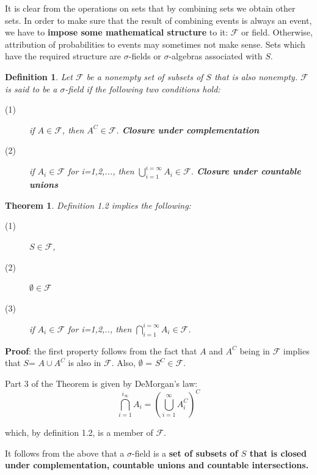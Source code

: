 \documentclass{article}
\newtheorem{definition}{Definition}[section]
\newtheorem{theorem}{Theorem}[section]
\begin{document}
It is clear from the operations on sets that by combining sets we obtain other sets. In order to make sure that the result of combining events is always an event, we have to \textbf{impose some mathematical structure} to it: \( \mathcal{F}\) or field. Otherwise, attribution of probabilities to events may sometimes not make sense. Sets which have the required structure are $\sigma$-fields or $\sigma$-algebras associated with \(S\).

\begin{definition}
    Let \( \mathcal{F}\) be a nonempty set of subsets of \(S\) that is also nonempty. \( \mathcal{F}\) is said to be a $\sigma$-field if the following two conditions hold:
    \begin{description}
        \item[(1)] if \(A \in \mathcal{F}\), then \(A^C \in \mathcal{F}\). \textbf{Closure under complementation}
        \item[(2)] if \(A_i \in \mathcal{F}\) for i=1,2,..., then \(\bigcup_{i=1}^{i=\infty} A_i \in \mathcal{F}\). \textbf{Closure under countable unions}
    \end{description}
\end{definition}

\begin{theorem}
    Definition 1.2 implies the following: 
    \begin{description}
        \item[(1)] \(S\in \mathcal{F}\),
        \item[(2)] \(\emptyset\in \mathcal{F}\) 
        \item[(3)] if \(A_i\in \mathcal{F}\) for i=1,2,.., then \(\bigcap_{i=1}^{i=\infty}A_i \in \mathcal{F}\).
    \end{description}  
\end{theorem}

\textbf{Proof}: the first property follows from the fact that \(A\) and \(A^C\) being in \( \mathcal{F}\) implies that \(S\)= \(A \cup A^C \) is also in \( \mathcal{F}\). Also, \( \emptyset\) = \(S^C \in \mathcal{F}\). 

Part 3 of the Theorem is given by DeMorgan's law:
\begin{equation*}
    \bigcap_{i=1}^{i_{\infty}} A_i = \left( \bigcup_{i=1}^{\infty} A_i^C \right)^C
\end{equation*}

which, by definition 1.2, is a member of \( \mathcal{F}\).

It follows from the above that a $\sigma$-field is a \textbf{set of subsets of \(S\) that is closed under complementation, countable unions and countable intersections.} 
\end{document}
